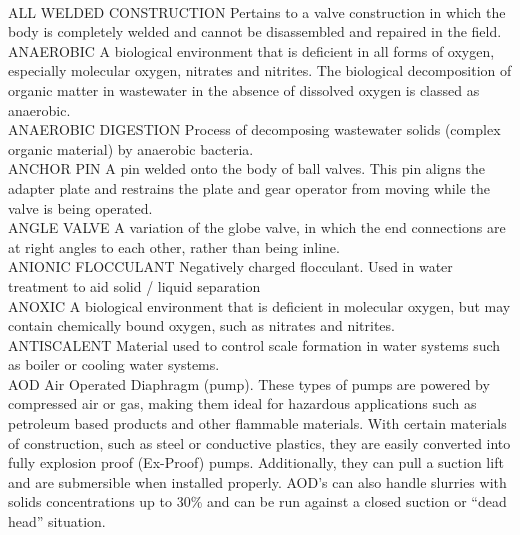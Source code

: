 \vspace{0.3cm}\\
ALL WELDED CONSTRUCTION
Pertains to a valve construction in which the body is completely welded and cannot be disassembled and repaired in the field.
\vspace{0.3cm}\\
ANAEROBIC
A biological environment that is deficient in all forms of oxygen, especially molecular oxygen, nitrates and nitrites. The biological decomposition of organic matter in wastewater in the absence of dissolved oxygen is classed as anaerobic.
\vspace{0.3cm}\\
ANAEROBIC DIGESTION
Process of decomposing wastewater solids (complex organic material) by anaerobic bacteria.
\vspace{0.3cm}\\
ANCHOR PIN
A pin welded onto the body of ball valves. This pin aligns the adapter plate and restrains the plate and gear operator from moving while the valve is being operated.
\vspace{0.3cm}\\
ANGLE VALVE
A variation of the globe valve, in which the end connections are at right angles to each other, rather than being inline.
\vspace{0.3cm}\\
ANIONIC FLOCCULANT
Negatively charged flocculant. Used in water treatment to aid solid / liquid separation
\vspace{0.3cm}\\
ANOXIC
A biological environment that is deficient in molecular oxygen, but may contain chemically bound oxygen, such as nitrates and nitrites.
\vspace{0.3cm}\\
ANTISCALENT
Material used to control scale formation in water systems such as boiler or cooling water systems.
\vspace{0.3cm}\\
AOD
Air Operated Diaphragm (pump). These types of pumps are powered by compressed air or gas, making them ideal for hazardous applications such as petroleum based products and other flammable materials. With certain materials of construction, such as steel or conductive plastics, they are easily converted into fully explosion proof (Ex-Proof) pumps. Additionally, they can pull a suction lift and are submersible when installed properly. AOD’s can also handle slurries with solids concentrations up to 30\% and can be run against a closed suction or “dead head” situation.
